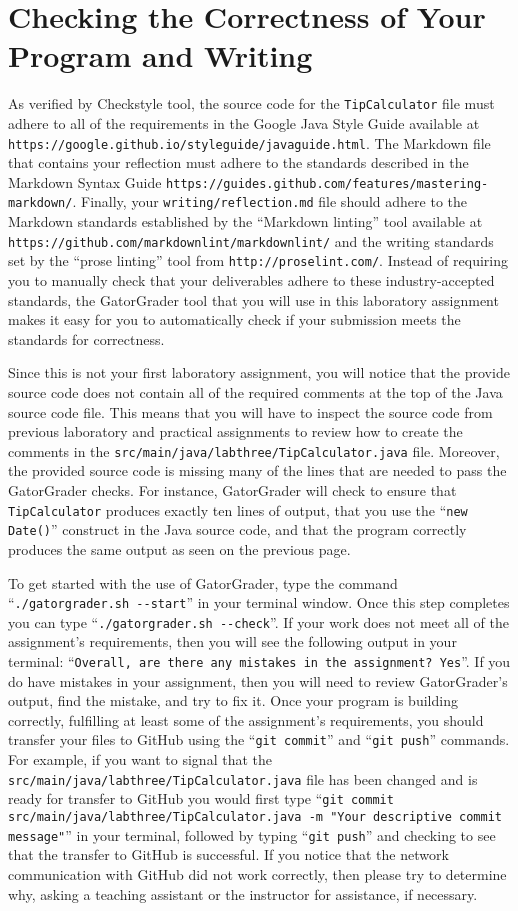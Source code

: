 \documentclass[11pt]{article}
\newcommand{\mainprogram}{\lstinline{TipCalculator}}
\newcommand{\mainprogramsource}{\lstinline{src/main/java/labthree/TipCalculator.java}}
\newcommand{\reflection}{\lstinline{writing/reflection.md}}
\newcommand{\gatorgraderstart}{\command{./gatorgrader.sh --start}}
\newcommand{\gatorgradercheck}{\command{./gatorgrader.sh --check}}
\newcommand{\gitcommit}{\command{git commit}}
\newcommand{\gitpush}{\command{git push}}
\newcommand{\gitcommitmainprogram}{\command{git commit src/main/java/labthree/TipCalculator.java -m "Your
descriptive commit message"}}
\newcommand{\command}[1]{``\lstinline{#1}''}
\newcommand{\url}[1]{\lstinline{#1}}
\newcommand{\step}[1]{``{#1}''}
\begin{document}
\section*{Checking the Correctness of Your Program and Writing}

As verified by Checkstyle tool, the source code for the \mainprogram{} file must adhere to all of the requirements in
the Google Java Style Guide available at \url{https://google.github.io/styleguide/javaguide.html}. The Markdown file
that contains your reflection must adhere to the standards described in the Markdown Syntax Guide
\url{https://guides.github.com/features/mastering-markdown/}. Finally, your \reflection{} file should adhere to the
Markdown standards established by the \step{Markdown linting} tool available at
\url{https://github.com/markdownlint/markdownlint/} and the writing standards set by the \step{prose linting} tool from
\url{http://proselint.com/}. Instead of requiring you to manually check that your deliverables adhere to these
industry-accepted standards, the GatorGrader tool that you will use in this laboratory assignment makes it easy for you
to automatically check if your submission meets the standards for correctness.

Since this is not your first laboratory assignment, you will notice that the provide source code does not contain all of
the required comments at the top of the Java source code file. This means that you will have to inspect the source code
from previous laboratory and practical assignments to review how to create the comments in the \mainprogramsource{}
file. Moreover, the provided source code is missing many of the lines that are needed to pass the GatorGrader checks.
For instance, GatorGrader will check to ensure that \mainprogram{} produces exactly ten lines of output, that you use
the \command{new Date()} construct in the Java source code, and that the program correctly produces the same output as
seen on the previous page.

To get started with the use of GatorGrader, type the command \gatorgraderstart{} in your terminal window. Once this step
completes you can type \gatorgradercheck{}. If your work does not meet all of the assignment's requirements, then you
will see the following output in your terminal: \command{Overall, are there any mistakes in the assignment? Yes}. If you
do have mistakes in your assignment, then you will need to review GatorGrader's output, find the mistake, and try to fix
it. Once your program is building correctly, fulfilling at least some of the assignment's requirements, you should
transfer your files to GitHub using the \gitcommit{} and \gitpush{} commands. For example, if you want to signal that
the \mainprogramsource{} file has been changed and is ready for transfer to GitHub you would first type
\gitcommitmainprogram{} in your terminal, followed by typing \gitpush{} and checking to see that the transfer to GitHub
is successful. If you notice that the network communication with GitHub did not work correctly, then please try to
determine why, asking a teaching assistant or the instructor for assistance, if necessary.
\end{document}
